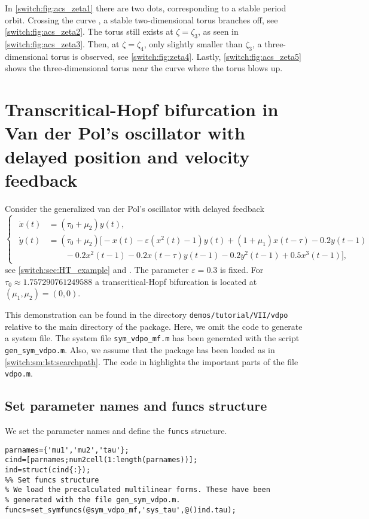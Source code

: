 In \cref{switch:fig:acs_zeta1} there are two dots, corresponding to a stable period orbit. Crossing the curve , a stable two-dimensional torus branches off, see \cref{switch:fig:acs_zeta2}. The torus still exists at $\zeta=\zeta_{3}$, as seen in  \cref{switch:fig:acs_zeta3}. Then, at $\zeta=\zeta_{4}$, only slightly smaller than $\zeta_{3}$, a three-dimensional torus is observed, see \cref{switch:fig:zeta4}. Lastly, \cref{switch:fig:acs_zeta5} shows the three-dimensional torus near the curve where the torus blows up.

\section{Transcritical-Hopf bifurcation in Van der Pol's oscillator with delayed position and velocity feedback}
Consider the generalized van der Pol's oscillator with delayed feedback\begin{equation}
\begin{cases}
\begin{aligned}
\dot{x}(t)&=\left(\tau_0+\mu_2\right)y(t),\\[0.5em]
\dot{y}(t)&=\left(\tau_0+\mu_{2}\right)\big[-x(t)-\varepsilon(x^2(t)-1)y(t)+(1+\mu_1)x(t-\tau)-0.2y(t-1)\\[0.5em]
&\qquad-0.2x^2(t-1)-0.2x(t-\tau)y(t-1)-0.2 y^2(t-1)+0.5x^3(t-1)\big],
\end{aligned}
\end{cases}\label{switch:sm:eq:vdp}
\end{equation}
see \cref{switch:sec:HT_example} and \cite{Bramburger2014}. The parameter $\varepsilon=0.3$ is fixed. For $\tau_{0}\approx1.757290761249588$ a transcritical-Hopf bifurcation is located at $(\mu_1,\mu_2)=(0,0)$.

\begin{remark}
	This demonstration can be found in the directory \lstinline|demos/tutorial/VII/vdpo| relative to the main directory of the \DDEBIFTOOL package. Here, we omit the code to generate a system file. The system file \lstinline|sym_vdpo_mf.m| has been generated with the script \lstinline|gen_sym_vdpo.m|. Also, we assume that the \DDEBIFTOOL package has been loaded as in \cref{switch:sm:lst:searchpath}. The code in  highlights the important parts of the file \lstinline|vdpo.m|.
\end{remark}

\subsection{Set parameter names and funcs structure} \label{switch:sm:sec:vdpo:pars_and_funcs}
We set the parameter names and define the \lstinline|funcs| structure.
\begin{lstlisting}[style=customMatlab]
%% Set parameter names
parnames={'mu1','mu2','tau'};
cind=[parnames;num2cell(1:length(parnames))];
ind=struct(cind{:});
%% Set funcs structure
% We load the precalculated multilinear forms. These have been
% generated with the file gen_sym_vdpo.m.
funcs=set_symfuncs(@sym_vdpo_mf,'sys_tau',@()ind.tau);
\end{lstlisting}

